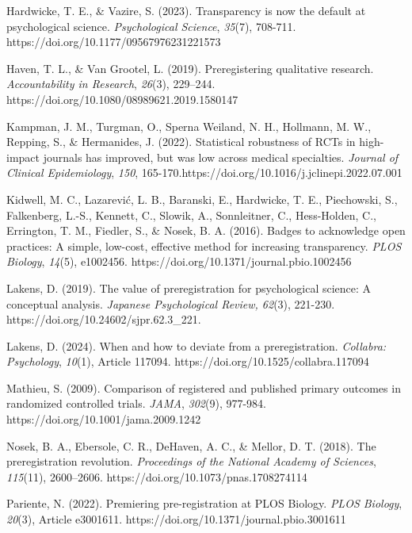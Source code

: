 \documentclass[authordate, empirical]{jote-new-article}
\begin{document}
	Hardwicke, T. E., \& Vazire, S. (2023). Transparency is now the default at psychological science. \emph{Psychological Science}, \emph{35}(7), 708-711. https://doi.org/10.1177/09567976231221573



	Haven, T. L., \& Van Grootel, L. (2019). Preregistering qualitative research. \emph{Accountability in Research}, \emph{26}(3), 229--244. https://doi.org/10.1080/08989621.2019.1580147



	Kampman, J. M., Turgman, O., Sperna Weiland, N. H., Hollmann, M. W., Repping, S., \& Hermanides, J. (2022). Statistical robustness of RCTs in high-impact journals has improved, but was low across medical specialties. \emph{Journal of Clinical Epidemiology}, \emph{150}, 165-170.https://doi.org/10.1016/j.jclinepi.2022.07.001



	Kidwell, M. C., Lazarević, L. B., Baranski, E., Hardwicke, T. E., Piechowski, S., Falkenberg, L.-S., Kennett, C., Slowik, A., Sonnleitner, C., Hess-Holden, C., Errington, T. M., Fiedler, S., \& Nosek, B. A. (2016). Badges to acknowledge open practices: A simple, low-cost, effective method for increasing transparency. \emph{PLOS Biology}, \emph{14}(5), e1002456. https://doi.org/10.1371/journal.pbio.1002456



	Lakens, D. (2019). The value of preregistration for psychological science: A conceptual analysis. \emph{Japanese Psychological Review, 62}(3), 221-230. https://doi.org/10.24602/sjpr.62.3\_221.



	Lakens, D. (2024). When and how to deviate from a preregistration. \emph{Collabra: Psychology}, \emph{10}(1), Article 117094. https://doi.org/10.1525/collabra.117094



	Mathieu, S. (2009). Comparison of registered and published primary outcomes in randomized controlled trials. \emph{JAMA}, \emph{302}(9), 977-984. https://doi.org/10.1001/jama.2009.1242



	Nosek, B. A., Ebersole, C. R., DeHaven, A. C., \& Mellor, D. T. (2018). The preregistration revolution. \emph{Proceedings of the National Academy of Sciences}, \emph{115}(11), 2600--2606. https://doi.org/10.1073/pnas.1708274114



	Pariente, N. (2022). Premiering pre-registration at PLOS Biology. \emph{PLOS Biology}, \emph{20}(3), Article e3001611. https://doi.org/10.1371/journal.pbio.3001611
\end{document}
